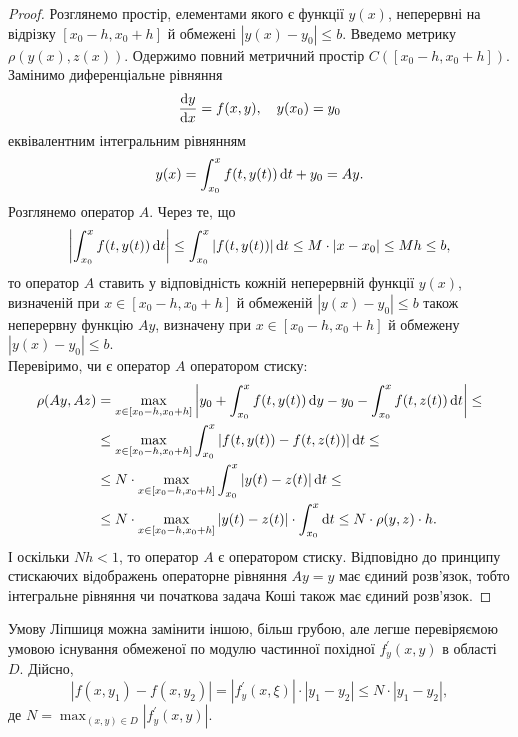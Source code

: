 \begin{proof}
	Розглянемо простір, елементами якого є функції $y(x)$, неперервні на відрізку $[x_0 - h, x_0 + h]$ й обмежені $|y(x) - y_0| \le b$. Введемо метрику $\rho(y(x), z(x))$. Одержимо повний метричний простір $C([x_0 - h, x_0 + h])$. Замінимо диференціальне рівняння
	\begin{equation*}
		\frac{\mathop{}\!\mathrm{d} y}{\mathop{}\!\mathrm{d} x} = f(x, y), \quad y(x_0) = y_0
	\end{equation*}
	еквівалентним інтегральним рівнянням
	\begin{equation*}
		y(x) = \int_{x_0}^x f(t, y(t)) \mathop{}\!\mathrm{d} t + y_0 = A y.
	\end{equation*}
	Розглянемо оператор $A$. Через те, що  
	\begin{equation*}
		\left|\int_{x_0}^x f(t, y(t)) \mathop{}\!\mathrm{d} t \right| \le \int_{x_0}^x |f(t, y(t))| \mathop{}\!\mathrm{d} t \le M \cdot |x-x_0| \le Mh \le b,
	\end{equation*}
	то оператор $A$ ставить у відповідність кожній неперервній функції $y(x)$, визначеній при $x\in[x_0 - h, x_0 + h]$ й обмеженій $|y(x)-y_0|\le b$ також неперервну функцію $Ay$,  визначену при $x\in[x_0 - h, x_0 + h]$ й обмежену $|y(x)-y_0|\le b$. \\

	Перевіримо, чи є оператор $A$ оператором стиску:
	\begin{align*}
		\rho(Ay, Az) &= \max_{x \in[x_0-h,x_0+h]} \left|y_0 + \int_{x_0}^x f(t, y(t)) \mathop{}\!\mathrm{d} y - y_0 - \int_{x_0}^x f(t, z(t)) \mathop{}\!\mathrm{d} t\right| \le \\
		&\le \max_{x \in[x_0-h,x_0+h]} \int_{x_0}^x |f(t, y(t)) - f(t, z(t))| \mathop{}\!\mathrm{d} t \le \\
		&\le N \cdot \max_{x \in[x_0-h,x_0+h]} \int_{x_0}^x |y(t) - z(t)| \mathop{}\!\mathrm{d} t \le \\
		&\le N \cdot \max_{x \in[x_0-h,x_0+h]} |y(t) - z(t)| \cdot \int_{x_0}^x \mathop{}\!\mathrm{d} t \le N \cdot \rho(y, z) \cdot h.
	\end{align*}
	І оскільки $Nh < 1$, то оператор $A$ є оператором стиску. Відповідно до принципу стискаючих відображень операторне рівняння $Ay=y$ має єдиний розв’язок, тобто інтегральне рівняння чи початкова задача Коші також має єдиний розв’язок.
\end{proof}

\begin{remark}
	Умову Ліпшиця можна замінити іншою, більш грубою, але легше перевіряємою умовою існування обмеженої по модулю частинної похідної $f_y^\prime (x,y)$ в області $D$. Дійсно,
	\begin{equation*}
		|f(x,y_1)-f(x,y_2)|=|f_y^\prime(x,\xi)|\cdot|y_1-y_2|\le N\cdot|y_1-y_2|,
	\end{equation*}
	де $N = \max_{(x,y)\in D} |f_y^\prime(x,y)|$.
\end{remark}

